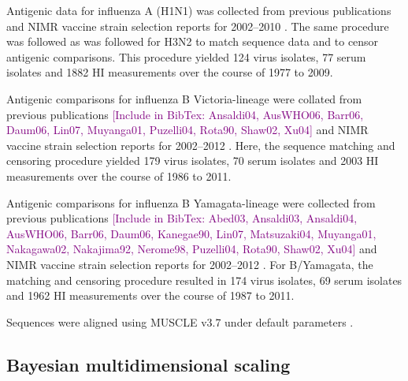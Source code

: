 \documentclass[11pt,oneside,letterpaper]{article}
\def\tbc#1{\textcolor{purple}{[#1]}}
\begin{document}
Antigenic data for influenza A (H1N1) was collected from previous publications \cite{Kendal78,Webster79,Nakajima79,Nakajima81,Chakraverty82,Pereira82,Chakraverty86,Cox83,Daniels85,Raymond86,Stevens87,Donatelli93,Hay01,Daum02,McDonald07,Barr10} and NIMR vaccine strain selection reports for 2002--2010 \cite{NIMR02,NIMR03,NIMR04,NIMRFeb05,NIMRSep05,NIMRMarch06,NIMRSep06,NIMRMarch07,NIMRSep07,NIMRMarch08,NIMRSep08,NIMRFeb09,NIMRFeb10}.
The same procedure was followed as was followed for H3N2 to match sequence data and to censor antigenic comparisons.
This procedure yielded 124 virus isolates, 77 serum isolates and 1882 HI measurements over the course of 1977 to 2009.

Antigenic comparisons for influenza B Victoria-lineage were collated from previous publications \cite{Hay01} \tbc{Include in BibTex: Ansaldi04, AusWHO06, Barr06, Daum06, Lin07, Muyanga01, Puzelli04, Rota90, Shaw02, Xu04} and NIMR vaccine strain selection reports for 2002--2012 \cite{NIMR02,NIMR03,NIMR04,NIMRFeb05,NIMRSep05,NIMRMarch06,NIMRSep06,NIMRMarch07,NIMRSep07,NIMRMarch08,NIMRFeb09,NIMRSep09,NIMRFeb10,NIMRSep10,NIMRFeb11,NIMRSep11,NIMRFeb12}.
Here, the sequence matching and censoring procedure yielded 179 virus isolates, 70 serum isolates and 2003 HI measurements over the course of 1986 to 2011.

Antigenic comparisons for influenza B Yamagata-lineage were collected from previous publications \cite{Hay01} \tbc{Include in BibTex: Abed03, Ansaldi03, Ansaldi04, AusWHO06, Barr06, Daum06, Kanegae90, Lin07, Matsuzaki04, Muyanga01, Nakagawa02, Nakajima92, Nerome98, Puzelli04, Rota90, Shaw02, Xu04} and NIMR vaccine strain selection reports for 2002--2012 \cite{NIMR02,NIMR03,NIMR04,NIMRFeb05,NIMRSep05,NIMRMarch06,NIMRSep06,NIMRMarch07,NIMRSep07,NIMRMarch08,NIMRFeb09,NIMRSep09,NIMRFeb10,NIMRSep10,NIMRFeb11,NIMRSep11,NIMRFeb12}.
For B/Yamagata, the matching and censoring procedure resulted in 174 virus isolates, 69 serum isolates and 1962 HI measurements over the course of 1987 to 2011.

Sequences were aligned using MUSCLE v3.7 under default parameters \cite{MUSCLE}.

\subsection*{Bayesian multidimensional scaling}
\end{document}
